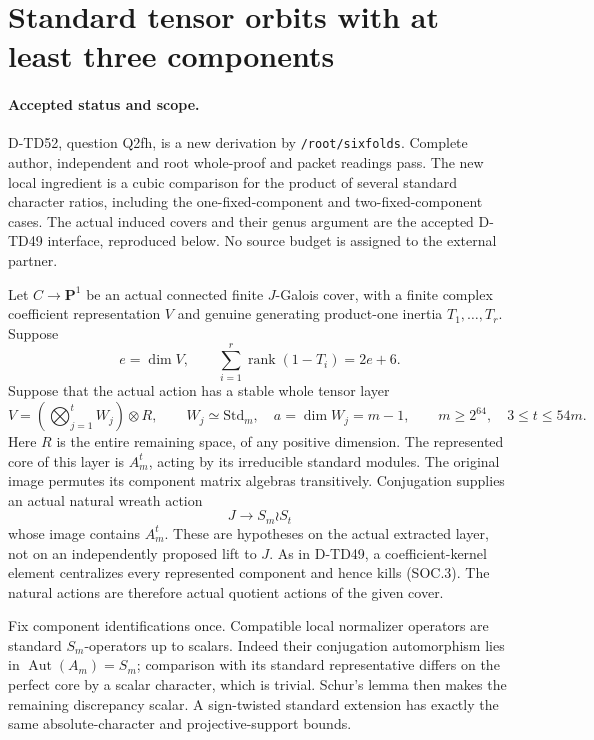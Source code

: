 \section{Standard tensor orbits with at least three components}
\label{sec:standard-orbit-cubic}

\paragraph{Accepted status and scope.}
D-TD52, question Q2fh, is a new derivation by
\texttt{/root/sixfolds}. Complete author, independent and root
whole-proof and packet readings pass. The new local ingredient is a cubic comparison for
the product of several standard character ratios, including the
one-fixed-component and two-fixed-component cases. The actual induced
covers and their genus argument are the accepted D-TD49 interface,
reproduced below. No source budget is assigned to the external partner.

Let \(C\longrightarrow\mathbf P^1\) be an actual connected finite
\(J\)-Galois cover, with a finite complex coefficient representation
\(V\) and genuine generating product-one inertia \(T_1,\ldots,T_r\).
Suppose
\[
 e=\dim V,\qquad
       \sum_{i=1}^r\operatorname{rank}(1-T_i)=2e+6.
 \tag{SOC.1}
\]
Suppose that the actual action has a stable whole tensor layer
\[
 V=\left(\bigotimes_{j=1}^t W_j\right)\otimes R,\qquad
 W_j\simeq\mathrm{Std}_m,\quad a=\dim W_j=m-1,\qquad
 m\ge2^{64},\quad 3\le t\le54m.
 \tag{SOC.2}
\]
Here \(R\) is the entire remaining space, of any positive dimension.
The represented core of this layer is \(A_m^t\), acting by its
irreducible standard modules. The original image permutes its component
matrix algebras transitively. Conjugation supplies an actual natural
wreath action
\[
             J\longrightarrow S_m\wr S_t
 \tag{SOC.3}
\]
whose image contains \(A_m^t\). These are hypotheses on the actual
extracted layer, not on an independently proposed lift to \(J\).
As in D-TD49, a coefficient-kernel element centralizes every represented
component and hence kills (SOC.3). The natural actions are therefore
actual quotient actions of the given cover.

Fix component identifications once. Compatible local normalizer
operators are standard \(S_m\)-operators up to scalars. Indeed their
conjugation automorphism lies in \(\operatorname{Aut}(A_m)=S_m\);
comparison with its standard representative differs on the perfect
core by a scalar character, which is trivial. Schur's lemma then makes
the remaining discrepancy scalar. A sign-twisted standard extension
has exactly the same absolute-character and projective-support bounds.

